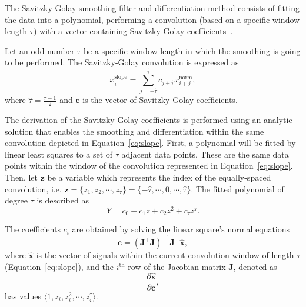 The Savitzky-Golay smoothing filter and differentiation method consists of fitting the data into a polynomial, performing a convolution (based on a specific window length $\tau$) with a vector containing Savitzky-Golay coefficients~\citep{madden1978}.

Let an odd-number $\tau$ be a specific window length in which the smoothing is going to be performed. The Savitzky-Golay convolution is expressed as
\begin{equation}
  \label{eq:slope}
  {x}^{\text{slope}}_{i} = \sum\limits_{j=-\hat{\tau}}^{\hat{\tau}} {c}_{j+\hat{\tau}} {x}^{\text{norm}}_{i+j},
\end{equation}
where $\hat{\tau}=\frac{\tau-1}{2}$ and $\mathbf{c}$ is the vector of Savitzky-Golay coefficients.

The derivation of the Savitzky-Golay coefficients is performed using an analytic solution that enables the smoothing and differentiation within the same convolution depicted in Equation~\ref{eq:slope}. First, a polynomial will be fitted by linear least squares to a set of $\tau$ adjacent data points. These are the same data points within the window of the convolution represented in Equation~\ref{eq:slope}. Then, let $\mathbf{z}$ be a variable which represents the index of the equally-spaced convolution, i.e. $\mathbf{z} = \{ {z}_{1}, {z}_{2}, \cdots, {z}_{\tau} \} = \{ -\hat{\tau}, \cdots, 0, \cdots, \hat{\tau}\}$. The fitted polynomial of degree $\tau$ is described as
\begin{equation}
  \label{eq:sg.polynomial}
  Y = {c}_{0} + {c}_{1}{z} + {c}_{2}{z}^{2} + {c}_{\tau}{z}^{\tau}.
\end{equation}

The coefficients $c_i$ are obtained by solving the linear square's normal equations
\begin{equation}
  \label{eq:savitzky.golay.coeff}
  \mathbf{c} = {\left( \mathbf{J}^{\intercal} \mathbf{J} \right)}^{-1} \mathbf{J}^{\intercal} \mathbf{\hat{x}},
\end{equation}
where $\mathbf{\hat{x}} $ is the vector of signals within the current convolution window of length $\tau$ (Equation~\ref{eq:slope}), and the  $i^{\text{th}}$ row of the Jacobian matrix $\mathbf{J}$, denoted as
\begin{equation}
  \label{eq:savitzky.golay.jacob}
  \frac{\partial \mathbf{\hat{x}} }{\partial \mathbf{c}},
\end{equation}
has values $ \langle 1, {z}_{i}, {z}_{i}^{2}, \cdots, {z}_{i}^{\tau} \rangle$.

